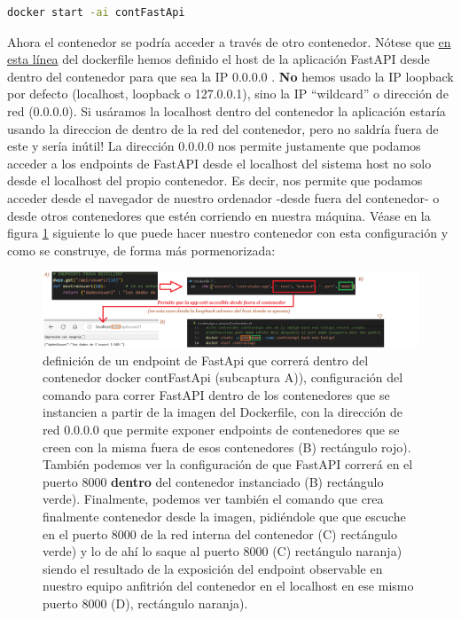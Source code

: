 \documentclass[a4paper,12pt]{report}
\begin{document}
	\begin{lstlisting}[language=bash]
		docker start -ai contFastApi
	\end{lstlisting}
	
	
	Ahora el contenedor se podría acceder a través de otro contenedor. Nótese que  \href{https://github.com/blackcub3s/mercApp/blob/cf678ebf99ce636b64c70c8faa239658a601550d/APP%20WEB/__FastAPI__/Dockerfile#L22}{en esta línea} del dockerfile hemos definido el host de la aplicación FastAPI desde dentro del contenedor para que sea la IP 0.0.0.0 . \textbf{No }hemos usado la IP loopback por defecto (localhost, loopback o 127.0.0.1), sino la IP ``wildcard'' o dirección de red (0.0.0.0). Si usáramos la localhost dentro del contenedor la aplicación estaría usando la direccion de dentro de la red del contenedor, pero no saldría fuera de este y sería inútil! La dirección 0.0.0.0 nos permite justamente que podamos acceder a los endpoints de FastAPI desde el localhost del sistema host no solo desde el localhost del propio contenedor. Es decir, nos permite que podamos acceder desde el navegador de nuestro ordenador -desde fuera del contenedor- o desde otros contenedores que estén corriendo en nuestra máquina. Véase en la figura \ref{fig:demofastapiendpointdummy} siguiente lo que puede hacer nuestro contenedor con esta configuración y como se construye, de forma más pormenorizada:
	
	\FloatBarrier
	\begin{figure}[H]
		\centering
		\caption{definición de un endpoint de FastApi que correrá dentro del contenedor docker contFastApi (subcaptura A)), configuración del comando para correr FastAPI dentro de los contenedores que se instancien a partir de la imagen del Dockerfile, con la dirección de red 0.0.0.0 que permite exponer endpoints de contenedores que se creen con la misma fuera de esos contenedores (B) rectángulo rojo). También podemos ver la configuración de que FastAPI correrá en el puerto 8000 \textbf{dentro} del contenedor instanciado (B) rectángulo verde). Finalmente, podemos ver también el comando que crea finalmente contenedor desde la imagen, pidiéndole que que escuche en el puerto 8000 de la red interna del contenedor (C) rectángulo verde) y lo de ahí lo saque al puerto 8000 (C) rectángulo naranja) siendo el resultado de la exposición del endpoint observable en nuestro equipo anfitrión del contenedor en el localhost en ese mismo puerto 8000 (D), rectángulo naranja).}
		\label{fig:demofastapiendpointdummy}
		\includegraphics[width=1\linewidth]{img/demoFastApiEndpointDummy}
	\end{figure}
	\FloatBarrier
	
\end{document}
